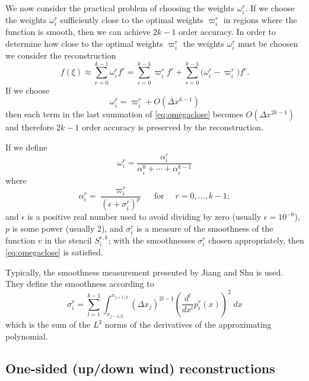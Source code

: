 \documentclass{article}
\newcommand{\for}[0]{\quad \text{ for } \quad}
\newcommand{\xlj}[0]{x_{j-1/2}}
\newcommand{\xrj}[0]{x_{j+1/2}}
\numberwithin{equation}{section}
\begin{document}
We now consider the practical problem of choosing the weights
$\omega_i^r$.  If we choose the weights $\omega_i^r$ sufficiently
close to the optimal weights $\varpi_i^r$ in regions where the
function is smooth, then we can achieve $2k-1$ order accuracy.  In
order to determine how close to the optimal weights $\varpi_i^r$ the
weights $\omega_i^r$ must be choosen we consider the reconstruction
\begin{equation}
  \label{eq:omegacloseeqn}
  f(\xi) \approx \sum_{r=0}^{k-1} \omega_i^r f^r
    = \sum_{r=0}^{k-1} \varpi_i^r f^r
    + \sum_{r=0}^{k-1} \bigl( \omega_i^r - \varpi_i^r \bigr) f^r.
\end{equation}
If we choose
\begin{equation}
  \label{eq:omegaclose}
  \omega_i^r = \varpi_i^r + O(\Delta x^{k-1})
\end{equation}
then each term in the last summation of \eqref{eq:omegaclose} becomes
$O(\Delta x^{2k-1})$ and therefore $2k-1$ order accuracy is preserved
by the reconstruction.

If we define
\begin{equation}
  \label{eq:omega}
  \omega_i^r = \frac{\alpha_i^r}{\alpha_i^0 + \cdots + \alpha_i^{k-1}}
\end{equation}
where
\begin{equation}
  \label{eq:alpha}
  \alpha_i^r = \frac{\varpi_i^r}{(\epsilon + \sigma_i^r)^p} \for r = 0, \ldots, k-1;
\end{equation}
and $\epsilon$ is a positive real number used to avoid dividing by
zero (usually $\epsilon = 10^{-6}$), $p$ is some power (usually 2),
and $\sigma_i^r$ is a measure of the smoothness of the function $v$ in
the stencil $S^{r,k}_i$; with the smoothnesses $\sigma_i^r$ chosen
appropriately, then \eqref{eq:omegaclose} is satisfied.

Typically, the smoothness measurement presented by Jiang and Shu is
used.  They define the smoothness according to
\begin{equation}
  \label{eq:sigma}
  \sigma_i^r = \sum_{l=1}^{k-1} \int_{\xlj}^{\xrj} (\Delta x_j)^{2l-1} \left( \frac{d^l}{dx^l} p_i^r(x)  \right)^2 \;dx
\end{equation}
which is the sum of the $L^2$ norms of the derivatives of the
approximating polynomial.

\newpage
\subsection{One-sided (up/down wind) reconstructions}
\end{document}
